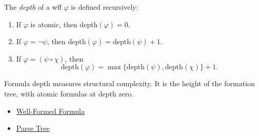 \begin{tcolorbox}[colback=propbox, colframe=propborder, arc=2pt,
  left=6pt, right=6pt, top=4pt, bottom=4pt,
  title={\small\textbf{Definition (Formula Depth)}},
  fonttitle=\small\bfseries]
\label{def:formula-depth-propositional-logic}
The \emph{depth} of a wff $\varphi$ is defined recursively:
\begin{enumerate}
  \item If $\varphi$ is atomic, then $\mathrm{depth}(\varphi)=0$.
  \item If $\varphi=\neg\psi$, then
        $\mathrm{depth}(\varphi)=\mathrm{depth}(\psi)+1$.
  \item If $\varphi=(\psi\circ\chi)$, then
        \[
        \mathrm{depth}(\varphi)
        =\max\{\mathrm{depth}(\psi),\mathrm{depth}(\chi)\}+1.
        \]
\end{enumerate}
\end{tcolorbox}

\begin{remark*}[Interpretation]
Formula depth measures structural complexity. It is the height of the formation
tree, with atomic formulas at depth zero.
\end{remark*}

\begin{dependencies}
\begin{itemize}
  \item \hyperref[def:well-formed-formula]{Well-Formed Formula}
  \item \hyperref[def:parse-tree]{Parse Tree}
\end{itemize}
\end{dependencies}
